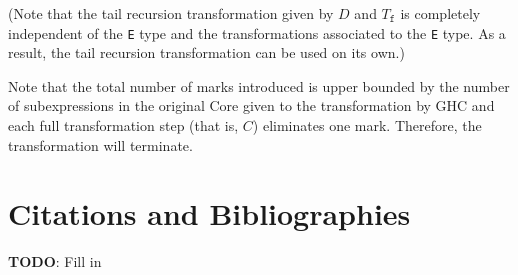 \documentclass[sigplan,screen]{acmart}
\newcommand{\ttt}{\texttt}
\providecommand\BibTeX{{%
    \normalfont B\kern-0.5em{\scshape i\kern-0.25em b}\kern-0.8em\TeX}}}
\begin{document}
\clearpage

(Note that the tail recursion transformation given by $D$ and $T_{\ttt{f}}$ is completely independent of the \ttt{E} type and the transformations associated to the \ttt{E} type. As a result, the tail recursion transformation can be used on its own.)

Note that the total number of marks introduced is upper bounded by the number of
subexpressions in the original Core given to the transformation by GHC and each
full transformation step (that is, $C$) eliminates one mark. Therefore, the
transformation will terminate.


\clearpage
\section{Citations and Bibliographies}


\begin{tcolorbox}
  \textbf{TODO}: Fill in
\end{tcolorbox}


%   
%   

\end{document}
